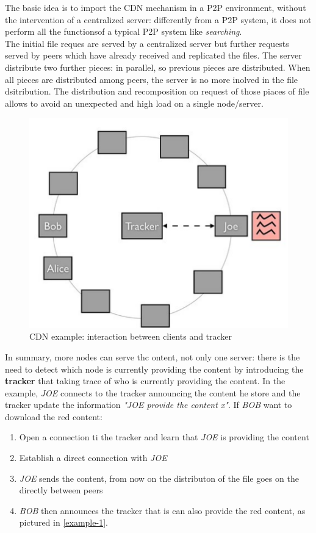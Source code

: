 \documentclass[10pt,a4paper]{report}
\begin{document}
The basic idea is to import the CDN mechanism in a P2P environment, without the intervention of a centralized server: differently from a P2P system, it does not perform all the functionsof a typical P2P system like \textit{searching}.\\
The initial file reques are served by a centralized server but further requests served by peers which have already received and replicated the files.
The server distribute two further pieces: in parallel, so previous pieces are distributed. When all pieces are distributed among peers, the server is no more inolved in the file dsitribution.
The distribution and recomposition on request of those piaces of file allows to avoid an unexpected and high load on a single node/server.
\begin{figure}
	\centering
	\includegraphics[scale=0.60]{images/Pasted image 20230311093749.png}
	\caption{CDN example: interaction between clients and tracker}
\end{figure}

In summary, more nodes can serve thc ontent, not only one server: there is the need to detect which node is currently providing the content by introducing the \textbf{tracker} that taking trace of who is currently providing the content. In the example, \textit{JOE} connects to the tracker announcing the content he store and the tracker update the information \textit{"JOE provide the content x"}.
If \textit{BOB} want to download the red content:
\begin{enumerate}
	\item 
	Open a connection ti the tracker and learn that \textit{JOE} is providing the content
	\item 
	Establish a direct connection with \textit{JOE}
	\item 
	\textit{JOE} sends the content, from now on the distributon of the file goes on the directly between peers
	\item 
	\textit{BOB} then announces the tracker that is can also provide the red content, as pictured in \ref{example-1}.


\end{enumerate}
\end{document}
